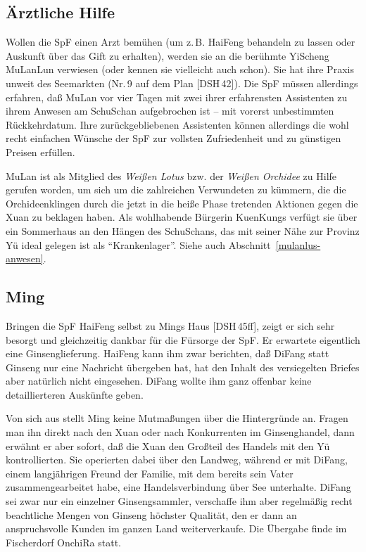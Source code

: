 \documentclass[
a4paper,
twoside,
DIV=calc,
BCOR=4mm,
fontsize=9pt,
twocolumn=on,
titlepage=on,
parskip=half
]{scrartcl}
\begin{document}
\subsection{Ärztliche Hilfe}

Wollen die SpF einen Arzt bemühen (um z.\,B. HaiFeng behandeln zu
lassen oder Auskunft über das Gift zu erhalten), werden sie an die
berühmte YiScheng MuLanLun verwiesen (oder kennen sie vielleicht auch
schon). Sie hat ihre Praxis unweit des Seemarkten (Nr.\,9 auf dem Plan
[DSH\,42]). Die SpF müssen allerdings erfahren, daß MuLan vor vier
Tagen mit zwei ihrer erfahrensten Assistenten zu ihrem Anwesen am
SchuSchan aufgebrochen ist -- mit vorerst unbestimmten
Rückkehrdatum. Ihre zurückgebliebenen Assistenten können allerdings
die wohl recht einfachen Wünsche der SpF zur vollsten Zufriedenheit
und zu günstigen Preisen erfüllen.

MuLan ist als Mitglied des \emph{Weißen Lotus} bzw. der \emph{Weißen
  Orchidee} zu Hilfe gerufen worden, um sich um die zahlreichen
Verwundeten zu kümmern, die die Orchideenklingen durch die jetzt in
die heiße Phase tretenden Aktionen gegen die Xuan zu beklagen
haben. Als wohlhabende Bürgerin KuenKungs verfügt sie über ein
Sommerhaus an den Hängen des SchuSchans, das mit seiner Nähe zur
Provinz Yü ideal gelegen ist als "`Krankenlager"'. Siehe auch
Abschnitt~\ref{mulanlus-anwesen}.

\subsection{Ming}

Bringen die SpF HaiFeng selbst zu Mings Haus [DSH\,45ff], zeigt er
sich sehr besorgt und gleichzeitig dankbar für die Fürsorge der
SpF. Er erwartete eigentlich eine Ginsenglieferung. HaiFeng kann ihm
zwar berichten, daß DiFang statt Ginseng nur eine Nachricht übergeben
hat, hat den Inhalt des versiegelten Briefes aber natürlich nicht
eingesehen. DiFang wollte ihm ganz offenbar keine detaillierteren
Auskünfte geben.

Von sich aus stellt Ming keine Mutmaßungen über die Hintergründe
an. Fragen man ihn direkt nach den Xuan oder nach Konkurrenten im
Ginsenghandel, dann erwähnt er aber sofort, daß die Xuan den Großteil
des Handels mit den Yü kontrollierten. Sie operierten dabei über den
Landweg, während er mit DiFang, einem langjährigen Freund der Familie,
mit dem bereits sein Vater zusammengearbeitet habe, eine
Handelsverbindung über See unterhalte. DiFang sei zwar nur ein
einzelner Ginsengsammler, verschaffe ihm aber regelmäßig recht
beachtliche Mengen von Ginseng höchster Qualität, den er dann an
anspruchsvolle Kunden im ganzen Land weiterverkaufe. Die Übergabe
finde im Fischerdorf OnchiRa statt.
\end{document}
